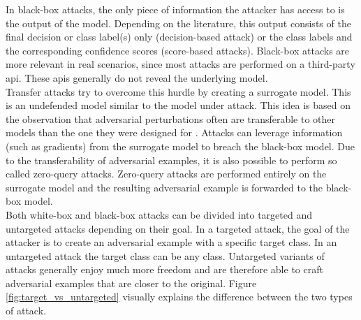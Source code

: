 In black-box attacks, the only piece of information the attacker has access to is the output of the model. Depending on the literature, this output consists of the final decision or class label(s) only (decision-based attack) or the class labels and the corresponding confidence scores (score-based attacks). Black-box attacks are more relevant in real scenarios, since most attacks are performed on a third-party \gls{api}. These \glspl{api} generally do not reveal the underlying model.\\

Transfer attacks \cite{transfer_attack} try to overcome this hurdle by creating a surrogate model. This is an undefended model similar to the model under attack. This idea is based on the observation that adversarial perturbations often are transferable to other models than the one they were designed for \cite{FGSM}. Attacks can leverage information (such as gradients) from the surrogate model to breach the black-box model. Due to the transferability of adversarial examples, it is also possible to perform so called zero-query attacks. Zero-query attacks are performed entirely on the surrogate model and the resulting adversarial example is forwarded to the black-box model.\\

Both white-box and black-box attacks can be divided into targeted and untargeted attacks depending on their goal. In a targeted attack, the goal of the attacker is to create an adversarial example with a specific target class. In an untargeted attack the target class can be any class. Untargeted variants of attacks generally enjoy much more freedom and are therefore able to craft adversarial examples that are closer to the original. Figure \ref{fig:target_vs_untargeted} visually explains the difference between the two types of attack.

